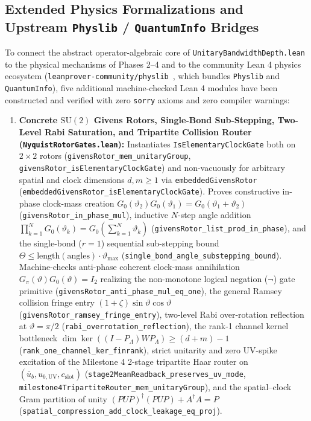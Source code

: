 \documentclass[11pt,a4paper]{article}
\theoremstyle{definition}
\begin{document}
\subsection{Extended Physics Formalizations and Upstream \texttt{Physlib} / \texttt{QuantumInfo} Bridges}
\label{subsec:phase5-extensions}
To connect the abstract operator-algebraic core of \texttt{Unitary\allowbreak{}Bandwidth\allowbreak{}Depth.lean} to the physical mechanisms of Phases 2--4 and to the community Lean 4 physics ecosystem (\texttt{leanprover-community/physlib}~\cite{tooby2024}, which bundles \texttt{Physlib} and \texttt{QuantumInfo}), five additional machine-checked Lean 4 modules have been constructed and verified with zero \texttt{sorry} axioms and zero compiler warnings:
\begin{enumerate}
\item \textbf{Concrete $\mathrm{SU}(2)$ Givens Rotors, Single-Bond Sub-Stepping, Two-Level Rabi Saturation, and Tripartite Collision Router (\texttt{Nyquist\allowbreak{}Rotor\allowbreak{}Gates.lean}):}
Instantiates \texttt{IsElementaryClockGate} both on $2 \times 2$ rotors (\texttt{givensRotor\_\allowbreak{}mem\_\allowbreak{}unitaryGroup}, \texttt{givensRotor\_\allowbreak{}isElementaryClockGate}) and non-vacuously for arbitrary spatial and clock dimensions $d, m \ge 1$ via \texttt{embeddedGivensRotor} (\texttt{embeddedGivensRotor\_\allowbreak{}isElementaryClockGate}). Proves constructive in-phase clock-mass creation $G_0(\vartheta_2)G_0(\vartheta_1) = G_0(\vartheta_1 + \vartheta_2)$ (\texttt{givensRotor\_\allowbreak{}in\_\allowbreak{}phase\_\allowbreak{}mul}), inductive $N$-step angle addition $\prod_{k=1}^N G_0(\vartheta_k) = G_0(\sum_{k=1}^N \vartheta_k)$ (\texttt{givensRotor\_\allowbreak{}list\_\allowbreak{}prod\_\allowbreak{}in\_\allowbreak{}phase}), and the single-bond ($r = 1$) sequential sub-stepping bound $\Theta \le \mathrm{length}(\text{angles}) \cdot \vartheta_{\max}$ (\texttt{single\_\allowbreak{}bond\_\allowbreak{}angle\_\allowbreak{}substepping\_\allowbreak{}bound}). Machine-checks anti-phase coherent clock-mass annihilation $G_\pi(\vartheta)G_0(\vartheta) = I_2$ realizing the non-monotone logical negation ($\neg$) gate primitive (\texttt{givensRotor\_\allowbreak{}anti\_\allowbreak{}phase\_\allowbreak{}mul\_\allowbreak{}eq\_\allowbreak{}one}), the general Ramsey collision fringe entry $(1 + \zeta)\sin\vartheta\cos\vartheta$ (\texttt{givensRotor\_\allowbreak{}ramsey\_\allowbreak{}fringe\_\allowbreak{}entry}), two-level Rabi over-rotation reflection at $\vartheta = \pi/2$ (\texttt{rabi\_\allowbreak{}overrotation\_\allowbreak{}reflection}), the rank-1 channel kernel bottleneck $\dim\ker((I - P_{\Lambda})W P_{\Lambda}) \ge (d + m) - 1$ (\texttt{rank\_\allowbreak{}one\_\allowbreak{}channel\_\allowbreak{}ker\_\allowbreak{}finrank}), strict unitarity and zero UV-spike excitation of the Milestone 4 2-stage tripartite Haar router on $(\bar{u}_b, u_{b,\text{UV}}, c_{\text{slot}})$ (\texttt{stage2MeanReadback\_\allowbreak{}preserves\_\allowbreak{}uv\_\allowbreak{}mode}, \texttt{milestone4TripartiteRouter\_\allowbreak{}mem\_\allowbreak{}unitaryGroup}), and the spatial--clock Gram partition of unity $(P U P)^\dagger(P U P) + A^\dagger A = P$ (\texttt{spatial\_\allowbreak{}compression\_\allowbreak{}add\_\allowbreak{}clock\_\allowbreak{}leakage\_\allowbreak{}eq\_\allowbreak{}proj}).

\end{enumerate}
\end{document}
